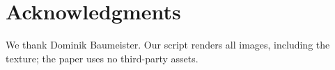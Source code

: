 \section*{Acknowledgments}
{We thank Dominik Baumeister.}
{}
Our script renders all images, including the texture; the paper uses no third-party assets.
